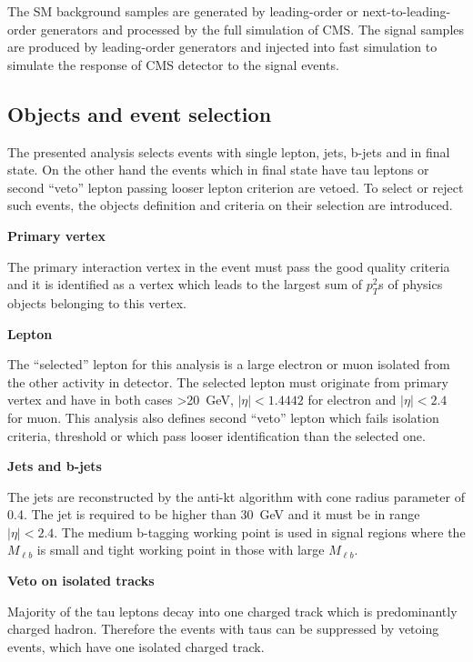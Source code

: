 The SM background samples are generated by leading-order or next-to-leading-order generators and processed by the full simulation of CMS. The signal samples are produced by leading-order generators and injected into fast simulation to simulate the response of CMS detector to the signal events.


\subsection{Objects and event selection~\label{sec:objects}}

The presented analysis selects events with single lepton, jets, b-jets and \MET in final state. On the other hand the events which in final state have tau leptons or second ``veto'' lepton passing looser lepton criterion are vetoed. To select or reject such events, the objects definition and criteria on their selection are introduced.

\textbf{Primary vertex}

The primary interaction vertex in the event must pass the good quality criteria and it is identified as a vertex which leads to the largest sum of $p_{T}^{2}$s of physics objects belonging to this vertex.

\textbf{Lepton}

The ``selected'' lepton for this analysis is a large \pt electron or muon isolated from the other activity in detector. The selected lepton must originate from primary vertex and have in both cases \pt>20~GeV, $|\eta|<1.4442$ for electron and $|\eta|<2.4$ for muon. This analysis also defines second ``veto'' lepton which fails isolation criteria, \pt threshold or which pass looser identification than the selected one. 

\textbf{Jets and b-jets}

The jets are reconstructed by the anti-kt algorithm with cone radius parameter of 0.4. The jet \pt is required to be higher than 30~GeV and it must be in range $|\eta|<2.4$. The medium b-tagging working point is used in signal regions where the $M_{\ell b}$ is small and tight working point in those with large $M_{\ell b}$.  

\textbf{Veto on isolated tracks}

Majority of the tau leptons decay into one charged track which is predominantly charged hadron. Therefore the events with taus can be suppressed by vetoing events, which have one isolated charged track.

